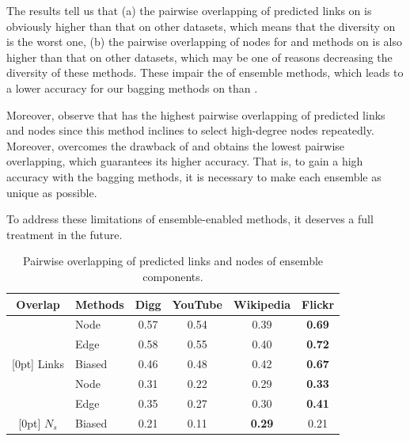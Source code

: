 The results tell us that (a) the pairwise overlapping of predicted links on \Flickr is
obviously higher than that on other datasets, which means that the diversity on \Flickr is the
worst one, (b) the pairwise overlapping of nodes for
\Node and \Edge methods on \Flickr is also higher than that on other datasets, which may be
one of reasons decreasing the diversity of these methods. These impair the  of ensemble methods,
which leads to a lower accuracy for our bagging methods on \Flickr than \NMF.

Moreover, observe that \Edge has the highest
pairwise overlapping of predicted links and nodes since this method inclines to select high-degree
nodes repeatedly. Moreover, \Biased overcomes the drawback of \Edge and obtains the lowest pairwise
overlapping, which guarantees its higher accuracy. That is, to gain a high accuracy with the bagging methods, it
is necessary to make each ensemble as unique as possible.



To address these limitations of ensemble-enabled methods, it deserves a full treatment in the future.



\begin{table}
\caption{Pairwise overlapping of predicted links and nodes of ensemble components.}
\label{tab_limitations}
\vspace{-2ex}
\centering
\newcommand{\tabincell}[2]{\begin{tabular}{@{}#1@{}}#2\end{tabular}}
\begin{tabular}{c|l|c|c|c|c}
\hline \hline Overlap & Methods & Digg & YouTube & Wikipedia & Flickr \\
\hline \hline
& Node & 0.57 & 0.54 & 0.39 & \textbf{0.69} \\
& Edge & 0.58 & 0.55 & 0.40 & \textbf{0.72} \\
\raisebox{2.5ex}[0pt]{ Links } & Biased & 0.46 & 0.48 & 0.42 & \textbf{0.67} \\
\hline
& Node & 0.31 & 0.22 & 0.29 & \textbf{0.33} \\
& Edge & 0.35 & 0.27 & 0.30 & \textbf{0.41} \\
\raisebox{2.5ex}[0pt]{ $N_s$ } & Biased & 0.21 & 0.11 & \textbf{0.29} & 0.21 \\
\hline \hline
\end{tabular}
\vspace{-2ex}
\end{table}



